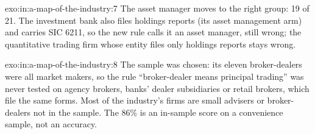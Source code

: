 \begin{solution}{exo:in:a-map-of-the-industry:7}
The asset manager moves to the right group: 19 of 21. The investment bank also files holdings reports (its asset
management arm) and carries SIC 6211, so the new rule calls it an asset manager, still wrong; the quantitative trading
firm whose entity files only holdings reports stays wrong.
\end{solution}

\begin{solution}{exo:in:a-map-of-the-industry:8}
The sample was chosen: its eleven broker-dealers were all market makers, so the rule ``broker-dealer means principal
trading'' was never tested on agency brokers, banks' dealer subsidiaries or retail brokers, which file the same forms.
Most of the industry's firms are small advisers or broker-dealers not in the sample. The 86\% is an in-sample score on
a convenience sample, not an accuracy.
\end{solution}

